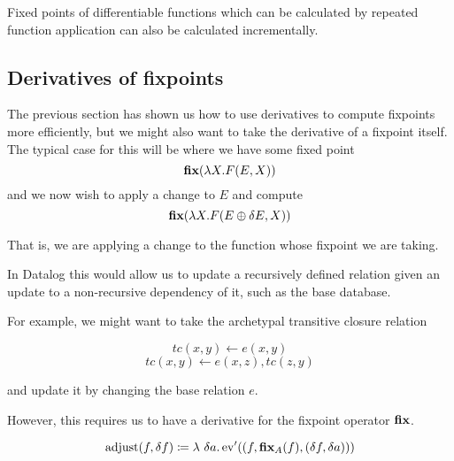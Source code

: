 \begin{corollary}
\label{corollary:diffFP}
  Fixed points of differentiable functions which can be calculated by repeated
  function application can also be calculated incrementally.
\end{corollary}

\subsection{Derivatives of fixpoints}
\label{sec:fixpointDerivatives}

The previous section has shown us how to use derivatives to compute fixpoints
more efficiently, but we might also want to take the derivative of a fixpoint
itself. The typical case for this will be where we have some fixed point
$$\textbf{fix} (\lambda X . F(E, X))$$
and we now wish to apply a change to $E$ and compute
$$\textbf{fix} (\lambda X . F(E \oplus \delta E, X))$$

That is, we are applying a change to the function whose fixpoint we are taking.

In Datalog this would allow us to update a recursively defined relation given an
update to a non-recursive dependency of it, such as the base database.

For example, we might want to take the archetypal transitive closure relation

$$tc(x, y) \leftarrow e(x, y)$$
$$tc(x, y) \leftarrow e(x, z), tc(z, y)$$

and update it by changing the base relation $e$.

However, this requires us to have a derivative for the fixpoint operator $\textbf{fix}$.

\newcommand{\theadjustment}{\operatorname{adjust}}

\begin{defn}
  $$\theadjustment(f, \change{f}) \defeq \lambda\ \change{a} . \derive{\ev}((f,
  \fixpoint_A(f), (\change{f}, \change{a})))$$
\end{defn}

